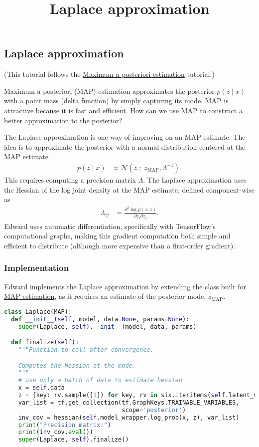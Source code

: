 \title{Laplace approximation}

\subsection{Laplace approximation}

(This tutorial follows the
\href{/tutorials/map}{Maximum a posteriori estimation} tutorial.)

Maximum a posteriori (MAP) estimation approximates the posterior $p(z \mid x)$
with a point mass (delta function) by simply capturing its mode. MAP is
attractive because it is fast and efficient. How can we use MAP to construct a
better approximation to the posterior?

The Laplace approximation
\citep{laplace1986memoir}
is one way of improving on an MAP estimate. The idea
is to approximate the posterior with a normal distribution centered at the MAP
estimate
\begin{align*}
  p(z \mid x)
  &\approx
  \mathcal{N}(z\;;\; z_\text{MAP}, \Lambda^{-1}).
\end{align*}
This requires computing a precision matrix $\Lambda$. The Laplace approximation
uses the Hessian of the log joint density at the MAP estimate,
defined component-wise as
\begin{align*}
  \Lambda_{ij}
  &=
  \frac{\partial^2 \log p(x, z)}{\partial z_i \partial z_j}.
\end{align*}
Edward uses automatic differentiation, specifically with TensorFlow's
computational graphs, making this gradient computation both simple and
efficient to distribute (although more expensive than a first-order
gradient).

\subsubsection{Implementation}

Edward implements the Laplace approximation by extending the class built for
\href{/tutorials/map}{MAP estimation}, as it requires an estimate of the
posterior mode, $z_\text{MAP}$.

\begin{lstlisting}[language=Python]
class Laplace(MAP):
  def __init__(self, model, data=None, params=None):
    super(Laplace, self).__init__(model, data, params)

  def finalize(self):
    """Function to call after convergence.

    Computes the Hessian at the mode.
    """
    # use only a batch of data to estimate hessian
    x = self.data
    z = {key: rv.sample([1]) for key, rv in six.iteritems(self.latent_vars)}
    var_list = tf.get_collection(tf.GraphKeys.TRAINABLE_VARIABLES,
                                 scope='posterior')
    inv_cov = hessian(self.model_wrapper.log_prob(x, z), var_list)
    print("Precision matrix:")
    print(inv_cov.eval())
    super(Laplace, self).finalize()
\end{lstlisting}

